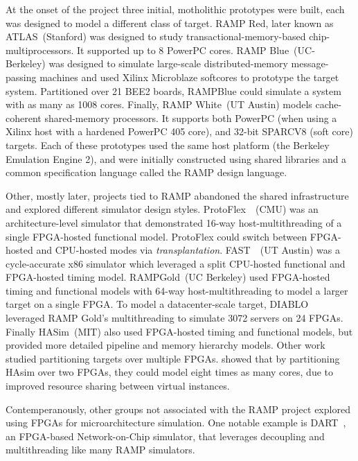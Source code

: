 At the onset of the project three initial, motholithic prototypes were built,
each was designed to model a different class of target.
RAMP Red, later known as ATLAS~\cite{ATLAS}(Stanford) was designed to study transactional-memory-based chip-multiprocessors. It supported up to 8 PowerPC cores.
RAMP Blue~\cite{RAMPBlue}(UC-Berkeley) was designed to simulate
large-scale distributed-memory message-passing machines and used Xilinx
Microblaze softcores to prototype the target system. Partitioned over 21
BEE2 boards, RAMPBlue could simulate a system with as many as 1008 cores.
Finally, RAMP White~\cite{RAMPWhite}(UT Austin) models cache-coherent
shared-memory processors. It supports both PowerPC (when using a Xilinx
host with a hardened PowerPC 405 core), and 32-bit SPARCV8 (soft core) targets.
Each of these prototypes used the same host platform (the Berkeley Emulation
Engine 2), and were initially constructed using shared libraries and a common
specification language called the RAMP design language.

Other, mostly later, projects tied to RAMP abandoned the shared infrastructure
and explored different simulator design styles.
ProtoFlex~\cite{ProtoFlex}~(CMU) was an architecture-level simulator that
demonstrated 16-way host-multithreading of a single FPGA-hosted functional
model.  ProtoFlex could switch between FPGA-hosted and CPU-hosted modes via
\emph{transplantation}.  FAST~\cite{FAST}~(UT Austin) was a cycle-accurate
x86 simulator which leveraged a split CPU-hosted functional and FPGA-hosted
timing model. RAMPGold~\cite{RAMPGold}(UC Berkeley) used FPGA-hosted timing
and functional models with 64-way host-multithreading to model a larger
target on a single FPGA.  To model a datacenter-scale target,
DIABLO~\cite{Diablo} leveraged RAMP Gold's multithreading to simulate 3072
servers on 24 FPGAs.  Finally HASim~\cite{HASim}(MIT) also used FPGA-hosted
timing and functional models, but provided more detailed pipeline and
memory hierarchy models. Other work studied partitioning targets over
multiple FPGAs. \cite{LIFPGADesign} showed that by partitioning HAsim over
two FPGAs, they could model eight times as many cores, due to improved
resource sharing between virtual instances.

Contemperanously, other groups not associated with the RAMP project explored
using FPGAs for microarchitecture simulation.  One notable example is
DART~\cite{DART}, an FPGA-based Network-on-Chip simulator, that leverages
decoupling and multithreading like many RAMP simulators.


